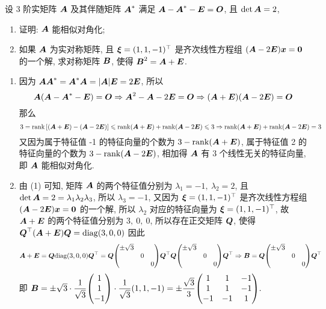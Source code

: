 \begin{example}
    设 3 阶实矩阵 $\vb*{A}$ 及其伴随矩阵 $\vb*{A}^*$ 满足 $\vb*{A}-\vb*{A}^*-\vb*{E}=\vb*{O}$, 且 $\det\vb*{A}=2$,
    \begin{enumerate}[label=(\arabic{*})]
        \item 证明: $\vb*{A}$ 能相似对角化;
        \item 如果 $\vb*{A}$ 为实对称矩阵, 且 $\vb*{\xi}=(1,1,-1)^\top$ 是齐次线性方程组 $(\vb*{A}-2\vb*{E})\vb*{x}=\vb*{0}$ 的一个解, 求对称矩阵 $\vb*{B}$, 使得 $\vb*{B}^2=\vb*{A}+\vb*{E}$.
    \end{enumerate}
\end{example}
\begin{solution}
    \begin{enumerate}[label=(\arabic{*})]
        \item 因为 $\vb*{AA}^*=\vb*{A}^*\vb*{A}=|\vb*{A}|\vb*{E}=2\vb*{E}$, 所以
              $$\vb*{A}\qty(\vb*{A}-\vb*{A}^*-\vb*{E})=\vb*{O}\Rightarrow \vb*{A}^2-\vb*{A}-2\vb*{E}=\vb*{O}\Rightarrow (\vb*{A}+\vb*{E})(\vb*{A}-2\vb*{E})=\vb*{O}$$
              那么 $$3=\rank\qty[(\vb*{A}+\vb*{E})-(\vb*{A}-2\vb*{E})]\leqslant \rank(\vb*{A}+\vb*{E})+\rank(\vb*{A}-2\vb*{E})\leqslant 3\Rightarrow \rank(\vb*{A}+\vb*{E})+\rank(\vb*{A}-2\vb*{E})=3$$
              又因为属于特征值 -1 的特征向量的个数为 $3-\rank(\vb*{A}+\vb*{E})$, 属于特征值 2 的特征向量的个数为 $3-\rank(\vb*{A}-2\vb*{E})$, 相加得 $\vb*{A}$ 有 3 个线性无关的特征向量, 即 $\vb*{A}$ 能相似对角化.
        \item 由 (1) 可知, 矩阵 $\vb*{A}$ 的两个特征值分别为 $\lambda_1=-1,~\lambda_2=2$, 且 $\det\vb*{A}=2=\lambda_1\lambda_2\lambda_3$, 所以 $\lambda_3=-1$, 又因为 $\vb*{\xi}=(1,1,-1)^\top$ 是齐次线性方程组 $(\vb*{A}-2\vb*{E})\vb*{x}=\vb*{0}$ 的一个解,
              所以 $\lambda_2$ 对应的特征向量为 $\vb*{\xi}=(1,1,-1)^\top$, 故 $\vb*{A}+\vb*{E}$ 的两个特征值分别为 $3,~0,~0$, 所以存在正交矩阵 $\vb*{Q}$, 使得 $\vb*{Q}^\top(\vb*{A}+\vb*{E})\vb*{Q}=\mathrm{diag}(3,0,0)$
              因此 $$\vb*{A}+\vb*{E}=\vb*{Q}\diag(3,0,0)\vb*{Q}^\top=\vb*{Q}\mqty(\dmat{\pm\sqrt{3},0,0})\vb*{Q}^\top\vb*{Q}\mqty(\dmat{\pm\sqrt{3},0,0})\vb*{Q}^\top\Rightarrow \vb*{B}=\vb*{Q}\mqty(\dmat{\pm\sqrt{3},0,0})\vb*{Q}^\top$$
              即 $\vb*{B}=\pm\sqrt{3}\cdot\dfrac{1}{\sqrt{3}}\mqty(1\\1\\-1)\cdot\dfrac{1}{\sqrt{3}}(1,1,-1)=\pm\dfrac{\sqrt{3}}{3}\mqty(1&1&-1\\1&1&-1\\-1&-1&1).$
    \end{enumerate}
\end{solution}

